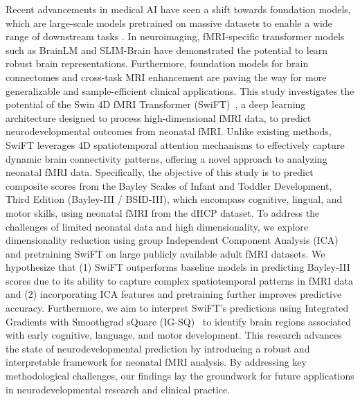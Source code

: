\documentclass[runningheads,a4paper]{llncs}
\begin{document}
Recent advancements in medical AI have seen a shift towards foundation models, which are large-scale models pretrained on massive datasets to enable a wide range of downstream tasks \cite{NatureMedicine2024Foundation,LancetDigitalHealth2024}. In neuroimaging, fMRI-specific transformer models such as BrainLM \cite{Rahman2024BrainLM} and SLIM-Brain \cite{SLIMBrain2024} have demonstrated the potential to learn robust brain representations. Furthermore, foundation models for brain connectomes \cite{Zhang2024Connectome} and cross-task MRI enhancement \cite{Sun2024NatureBME} are paving the way for more generalizable and sample-efficient clinical applications.
%
This study investigates the potential of the Swin 4D fMRI Transformer (SwiFT)~\cite{kim2023swiftswin4dfmri}, a deep learning architecture designed to process high-dimensional fMRI data, to predict neurodevelopmental outcomes from neonatal fMRI. Unlike existing methods, SwiFT leverages 4D spatiotemporal attention mechanisms to effectively capture dynamic brain connectivity patterns, offering a novel approach to analyzing neonatal fMRI data. Specifically, the objective of this study is to predict composite scores from the Bayley Scales of Infant and Toddler Development, Third Edition (Bayley-III / BSID-III), which encompass cognitive, lingual, and motor skills, using neonatal fMRI from the dHCP dataset. To address the challenges of limited neonatal data and high dimensionality, we explore dimensionality reduction using group Independent Component Analysis (ICA) and pretraining SwiFT on large publicly available adult fMRI datasets. 
%
We hypothesize that (1) SwiFT outperforms baseline models in predicting Bayley-III scores due to its ability to capture complex spatiotemporal patterns in fMRI data and (2) incorporating ICA features and pretraining further improves predictive accuracy. Furthermore, we aim to interpret SwiFT's predictions using Integrated Gradients with Smoothgrad sQuare (IG-SQ)~\cite{captum1} to identify brain regions associated with early cognitive, language, and motor development. 
%
This research advances the state of neurodevelopmental prediction by introducing a robust and interpretable framework for neonatal fMRI analysis. By addressing key methodological challenges, our findings lay the groundwork for future applications in neurodevelopmental research and clinical practice.

\end{document}
